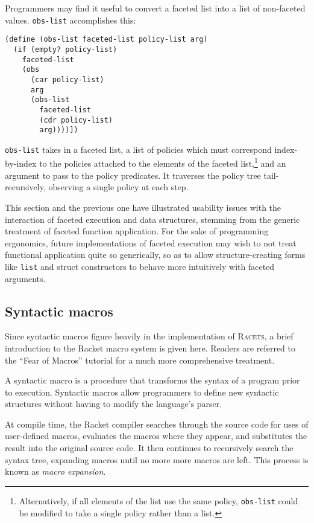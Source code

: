 \documentclass{article}
\begin{document}
Programmers may find it useful to convert a faceted list into a list of non-faceted values. \texttt{obs-list} accomplishes this:

\begin{lstlisting}
(define (obs-list faceted-list policy-list arg)
  (if (empty? policy-list)
    faceted-list
    (obs
      (car policy-list)
      arg
      (obs-list
        faceted-list
        (cdr policy-list)
        arg))))])
\end{lstlisting}

\texttt{obs-list} takes in a faceted list, a list of policies which must correspond index-by-index to the policies attached to the elements of the faceted list,\footnote{Alternatively, if all elements of the list use the same policy, \texttt{obs-list} could be modified to take a single policy rather than a list.} and an argument to pass to the policy predicates. It traverses the policy tree tail-recursively, observing a single policy at each step.

This section and the previous one have illustrated usability issues with the interaction of faceted execution and data structures, stemming from the generic treatment of faceted function application. For the sake of programming ergonomics, future implementations of faceted execution may wish to not treat functional application quite so generically, so as to allow structure-creating forms like \texttt{list} and struct constructors to behave more intuitively with faceted arguments.


\subsection{Syntactic macros}
Since syntactic macros figure heavily in the implementation of \textsc{Racets}, a brief introduction to the Racket macro system is given here. Readers are referred to the ``Fear of Macros'' tutorial \cite{fear-of-macros} for a much more comprehensive treatment.

A syntactic macro is a procedure that transforms the syntax of a program prior to execution. Syntactic macros allow programmers to define new syntactic structures without having to modify the language's parser.

At compile time, the Racket compiler searches through the source code for uses of user-defined macros, evaluates the macros where they appear, and substitutes the result into the original source code. It then continues to recursively search the syntax tree, expanding macros until no more more macros are left. This process is known as \textit{macro expansion}.
\end{document}

